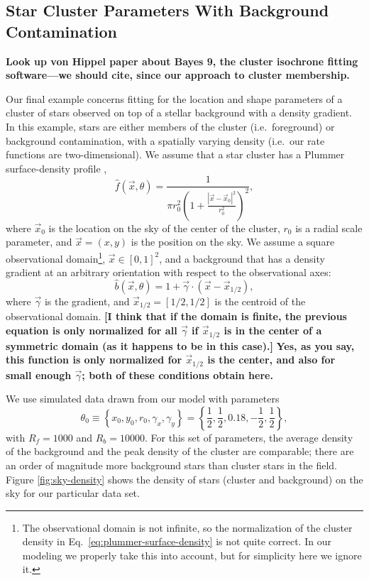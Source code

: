\documentclass[aps,prd]{revtex4-1}
\newcommand{\ilya}[1]{{\color{red} \bf #1}}
\newcommand{\will}[1]{{\color{blue} \bf #1}}
\begin{document}
\subsection{Star Cluster Parameters With Background Contamination}
\label{sec:star-cluster}

\will{Look up von Hippel paper about Bayes 9, the cluster isochrone
  fitting software---we should cite, since our approach to cluster
  membership.}

Our final example concerns fitting for the location and shape
parameters of a cluster of stars observed on top of a stellar
background with a density gradient.  In this example, stars are either
members of the cluster (i.e.~foreground) or background contamination,
with a spatially varying density (i.e.~our rate functions are
two-dimensional).  We assume that a star cluster has a Plummer
surface-density profile \citep{Plummer1911,Aarseth1974},
\begin{equation}
  \label{eq:plummer-surface-density}
  \hat{f}(\vec{x}, \theta) = \frac{1}{\pi r_0^2 \left( 1 +
    \frac{\left| \vec{x} - \vec{x}_0 \right|^2}{r_0^2} \right)^2},
\end{equation}
where $\vec{x}_0$ is the location on the sky of the center of the
cluster, $r_0$ is a radial scale parameter, and $\vec{x} = \left( x, y
\right)$ is the position on the sky.  We assume a square observational
domain\footnote{The observational domain is not infinite, so the
  normalization of the cluster density in
  Eq.~\eqref{eq:plummer-surface-density} is not quite correct.  In our
  modeling we properly take this into account, but for simplicity here
  we ignore it.}, $\vec{x} \in [0,1]^2$, and a background that has a
density gradient at an arbitrary orientation with respect to the
observational axes:
\begin{equation}
  \hat{b}\left(\vec{x}, \theta\right) = 1 + \vec{\gamma} \cdot \left(
  \vec{x} - \vec{x}_{1/2} \right),
\end{equation}
where $\vec{\gamma}$ is the gradient, and $\vec{x}_{1/2} = [1/2, 1/2]$
is the centroid of the observational domain.  \ilya{[I think that if
    the domain is finite, the previous equation is only normalized for
    all $\vec{\gamma}$ if $\vec{x}_{1/2}$ is in the center of a
    symmetric domain (as it happens to be in this case).]}  \will{Yes,
  as you say, this function is only normalized for $\vec{x}_{1/2}$ is
  the center, and also for small enough $\vec{\gamma}$; both of these
  conditions obtain here.}  

We use simulated data drawn from our model with parameters
\begin{equation}
\label{eq:true-cluster-parameters}
\theta_0 \equiv \left\{ x_0, y_0, r_0, \gamma_x, \gamma_y \right\} =
\left\{ \frac{1}{2}, \frac{1}{2}, 0.18, -\frac{1}{2},
\frac{1}{2} \right\},
\end{equation}
with $R_f = 1000$ and $R_b = 10000$.  For this set of parameters, the
average density of the background and the peak density of the cluster
are comparable; there are an order of magnitude more background stars
than cluster stars in the field.  Figure \ref{fig:sky-density} shows
the density of stars (cluster and background) on the sky for our
particular data set.
\end{document}
